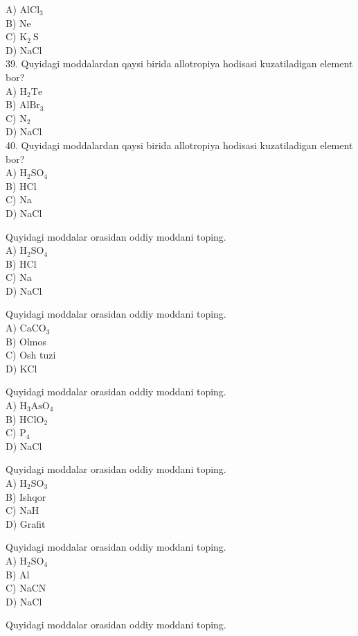 A) $\mathrm{AlCl}_{3}$\\
B) Ne\\
C) $\mathrm{K}_{2} \mathrm{~S}$\\
D) NaCl\\
39. Quyidagi moddalardan qaysi birida allotropiya hodisasi kuzatiladigan element bor?\\
A) $\mathrm{H}_{2} \mathrm{Te}$\\
B) $\mathrm{AlBr}_{3}$\\
C) $\mathrm{N}_{2}$\\
D) NaCl\\
40. Quyidagi moddalardan qaysi birida allotropiya hodisasi kuzatiladigan element bor?\\
A) $\mathrm{H}_{2} \mathrm{SO}_{4}$\\
B) HCl\\
C) Na\\
D) NaCl
  \item Quyidagi moddalar orasidan oddiy moddani toping.\\
A) $\mathrm{H}_{2} \mathrm{SO}_{4}$\\
B) HCl\\
C) Na\\
D) NaCl
  \item Quyidagi moddalar orasidan oddiy moddani toping.\\
A) $\mathrm{CaCO}_{3}$\\
B) Olmos\\
C) Osh tuzi\\
D) KCl
  \item Quyidagi moddalar orasidan oddiy moddani toping.\\
A) $\mathrm{H}_{3} \mathrm{AsO}_{4}$\\
B) $\mathrm{HClO}_{2}$\\
C) $\mathrm{P}_{4}$\\
D) NaCl
  \item Quyidagi moddalar orasidan oddiy moddani toping.\\
A) $\mathrm{H}_{2} \mathrm{SO}_{3}$\\
B) Ishqor\\
C) NaH\\
D) Grafit
  \item Quyidagi moddalar orasidan oddiy moddani toping.\\
A) $\mathrm{H}_{2} \mathrm{SO}_{4}$\\
B) Al\\
C) NaCN\\
D) NaCl
  \item Quyidagi moddalar orasidan oddiy moddani toping.\\
